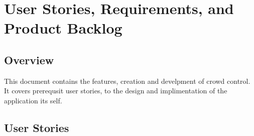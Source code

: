 
\chapter{User Stories,  Requirements, and Product Backlog}
\section{Overview}

This document contains the features, creation and develpment of crowd control. It covers prerequsit user stories, to the design and implimentation of the application its self.







\section{User Stories} \label{userStories}



